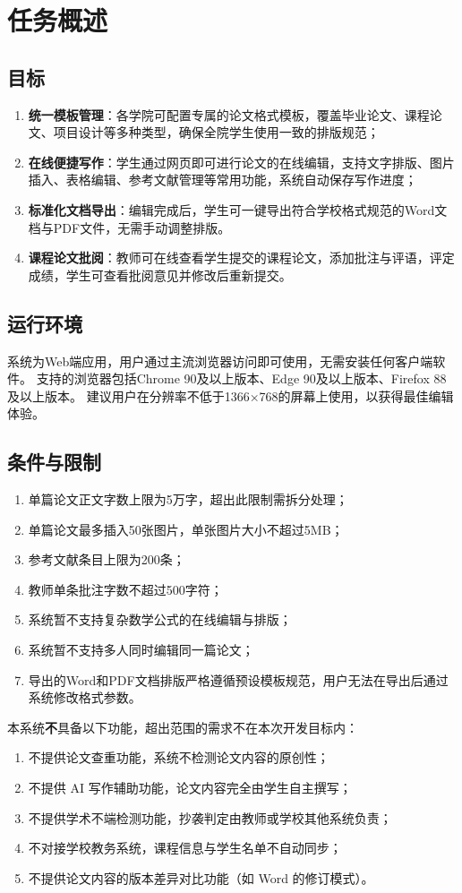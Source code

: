 \documentclass{softeng}
\begin{document}
\section{任务概述}
\subsection{目标}
	\begin{enumerate}
		\item \textbf{统一模板管理}：各学院可配置专属的论文格式模板，覆盖毕业论文、课程论文、项目设计等多种类型，确保全院学生使用一致的排版规范；
		\item \textbf{在线便捷写作}：学生通过网页即可进行论文的在线编辑，支持文字排版、图片插入、表格编辑、参考文献管理等常用功能，系统自动保存写作进度；
		\item \textbf{标准化文档导出}：编辑完成后，学生可一键导出符合学校格式规范的Word文档与PDF文件，无需手动调整排版。
		\item \textbf{课程论文批阅}：教师可在线查看学生提交的课程论文，添加批注与评语，评定成绩，学生可查看批阅意见并修改后重新提交。
	\end{enumerate}

\subsection{运行环境}
    系统为Web端应用，用户通过主流浏览器访问即可使用，无需安装任何客户端软件。
    支持的浏览器包括Chrome 90及以上版本、Edge 90及以上版本、Firefox 88及以上版本。
    建议用户在分辨率不低于1366×768的屏幕上使用，以获得最佳编辑体验。
	
\subsection{条件与限制}
	\begin{enumerate}
		\item 单篇论文正文字数上限为5万字，超出此限制需拆分处理；
		\item 单篇论文最多插入50张图片，单张图片大小不超过5MB；
		\item 参考文献条目上限为200条；
		\item 教师单条批注字数不超过500字符；
		\item 系统暂不支持复杂数学公式的在线编辑与排版；
		\item 系统暂不支持多人同时编辑同一篇论文；
		\item 导出的Word和PDF文档排版严格遵循预设模板规范，用户无法在导出后通过系统修改格式参数。
	\end{enumerate}
    本系统\textbf{不}具备以下功能，超出范围的需求不在本次开发目标内：
    \begin{enumerate}
	\item 不提供论文查重功能，系统不检测论文内容的原创性；
	\item 不提供 AI 写作辅助功能，论文内容完全由学生自主撰写；
	\item 不提供学术不端检测功能，抄袭判定由教师或学校其他系统负责；
	\item 不对接学校教务系统，课程信息与学生名单不自动同步；
	\item 不提供论文内容的版本差异对比功能（如 Word 的修订模式）。
	\end{enumerate}
\end{document}
